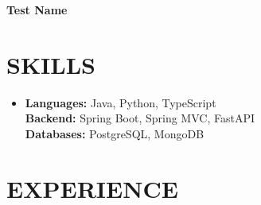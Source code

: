 \documentclass{article}
\begin{document}
\begin{center}
{\Huge \textbf{Test Name}}
\end{center}
\section{SKILLS}
\begin{itemize}[leftmargin=0in, label={}, itemsep=0pt, parsep=0pt, topsep=0pt, partopsep=0pt]
  \item \textbf{Languages:} Java, Python, TypeScript \\[1pt]
    \textbf{Backend:} Spring Boot, Spring MVC, FastAPI \\[1pt]
    \textbf{Databases:} PostgreSQL, MongoDB
\end{itemize}
\section{EXPERIENCE}
\resumeSubHeadingListStart
  \resumeItemListStart
  \resumeItemListEnd
\resumeSubHeadingListEnd
\end{document}
